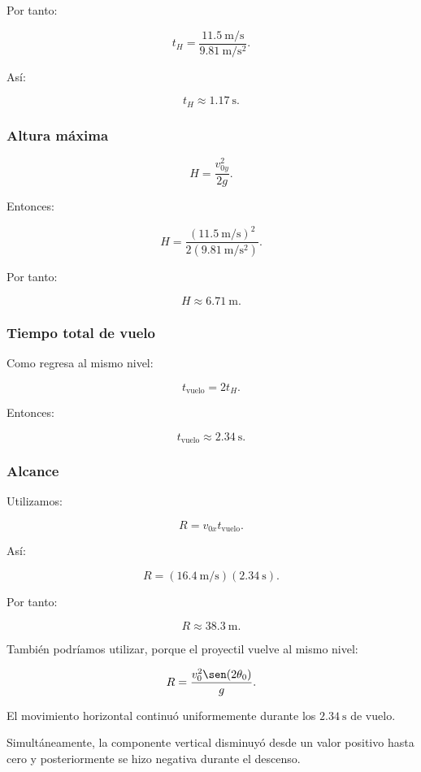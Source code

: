 Por tanto:

\[
t_H
=
\frac{
\SI{11.5}{\meter\per\second}
}{
\SI{9.81}{\meter\per\second\squared}
}.
\]

Así:

\[
\boxed{
t_H\approx\SI{1.17}{\second}
}.
\]


\subsubsection*{Altura máxima}

\[
H
=
\frac{v_{0y}^2}{2g}.
\]

Entonces:

\[
H
=
\frac{
(\SI{11.5}{\meter\per\second})^2
}{
2(\SI{9.81}{\meter\per\second\squared})
}.
\]

Por tanto:

\[
\boxed{
H\approx\SI{6.71}{\meter}
}.
\]


\subsubsection*{Tiempo total de vuelo}

Como regresa al mismo nivel:

\[
t_{\mathrm{vuelo}}=2t_H.
\]

Entonces:

\[
\boxed{
t_{\mathrm{vuelo}}
\approx
\SI{2.34}{\second}
}.
\]


\subsubsection*{Alcance}

Utilizamos:

\[
R=v_{0x}t_{\mathrm{vuelo}}.
\]

Así:

\[
R
=
(\SI{16.4}{\meter\per\second})
(\SI{2.34}{\second}).
\]

Por tanto:

\[
\boxed{
R\approx\SI{38.3}{\meter}
}.
\]

También podríamos utilizar, porque el proyectil vuelve al mismo nivel:

\[
R
=
\frac{
v_0^2\sen(2\theta_0)
}{
g
}.
\]

\begin{interpretacion}
El movimiento horizontal continuó uniformemente durante los
\(\SI{2.34}{\second}\) de vuelo.

Simultáneamente, la componente vertical disminuyó desde un valor positivo hasta
cero y posteriormente se hizo negativa durante el descenso.
\end{interpretacion}


